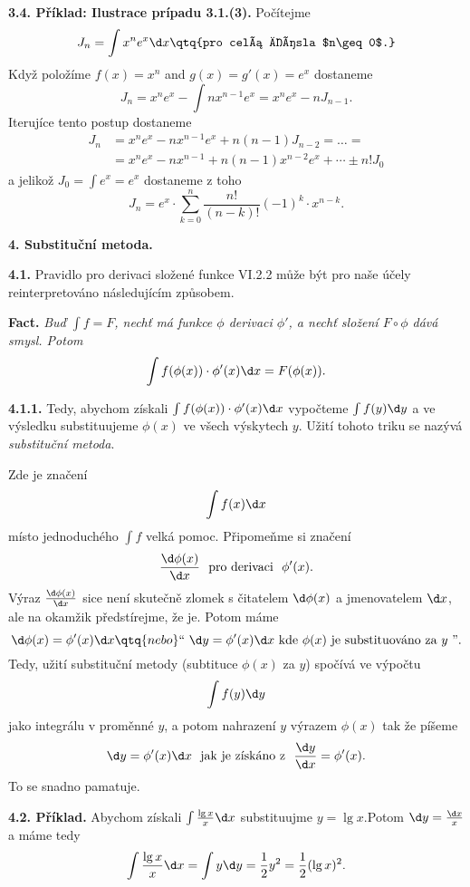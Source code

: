 \documentclass[12pt]{article}
\begin{document}
{ \bigskip
 
 {\bf 3.4. Příklad: Ilustrace prípadu 3.1.(3).} Počítejme
 $$
 J_n=\int x^ne^x\d x \qtq{pro celá čísla $n\geq 0$.}
 $$
Když položíme $f(x)=x^n$ and $g(x)=g'(x)=e^x$ dostaneme
 $$
 J_n=x^ne^x-\int nx^{n-1}e^x= x^ne^x-nJ_{n-1}.
 $$
 Iterujíce tento postup dostaneme
 $$
 \begin{aligned}
 J_n&=x^ne^x-nx^{n-1}e^x+n(n-1)J_{n-2}=\dots=\\
 &=x^ne^x-nx^{n-1}+n(n-1)x^{n-2}e^x+\cdots\pm n!J_0
 \end{aligned}
 $$
 a jelikož $J_0=\int e^x=e^x$ dostaneme z toho
 $$
 J_n=e^x\cdot\sum_{k=0}^n\frac{n!}{(n-k)!}(-1)^k\cdot x^{n-k}.
 $$
 
 \vskip10mm
 
 {\large\bf 4. Substituční metoda.}
 
  
 \bigskip
 
 {\bf 4.1.} Pravidlo pro derivaci složené funkce VI.2.2 může být pro naše účely reinterpretováno následujícím způsobem.
 
 \medskip
 
 {\bf Fact.} {\em Buď $\int f=F$, nechť má funkce $\phi$ derivaci $\phi'$, a nechť složení $F\circ\phi$ dává smysl. Potom
 $$
 \int f(\phi(x))\cdot\phi'(x)\d x=F(\phi(x)).
 $$}
 
 \medskip
 
 {\bf 4.1.1.} Tedy, abychom získali $\int f(\phi(x))\cdot\phi'(x)\d x$ vypočteme
 $\int f(y)\d y$ a ve výsledku substituujeme $\phi(x)$ ve všech výskytech $y$. Užití tohoto triku se nazývá {\em substituční metoda}.
 
 \smallskip
 
 Zde je značení
 $$
 \int f(x)\d x
 $$
 místo jednoduchého $\int f$ velká pomoc. Připomeňme si značení
 $$
 \frac{\d\phi(x)}{\d x}\ \ \text{pro derivaci}\ \ \phi'(x).
 $$
 Výraz  $\frac{\d\phi(x)}{\d x}$ sice není skutečně zlomek s čitatelem $\d\phi(x)$ a jmenovatelem $\d x$, ale na okamžik předstírejme, že je. Potom máme
 $$
 \d\phi(x)=\phi'(x)\d x \qtq{nebo} ``\ \d y=\phi'(x)\d x \ \text{kde}\ \phi(x)\ \text{je substituováno za $y$ ''}.
 $$
 Tedy, užití substituční metody (subtituce $\phi(x)$ za $y$) spočívá ve výpočtu
 $$
 \int f(y)\d y
 $$
 jako integrálu v proměnné $y$, a potom nahrazení $y$ výrazem $\phi(x)$ tak že píšeme
 $$
 \d y=\phi'(x)\d x\ \ \text{jak je získáno z}\ \ \frac{\d y}{\d x}=\phi'(x).
 $$
 To se snadno pamatuje.
 
 \bigskip
 
 {\bf 4.2. Příklad.} Abychom získali 
 $
 \int\frac{\lg x}{x}\d x
 $
 substituujme $y=\lg x$.Potom $\d y=\frac{\d x}{x}$ a máme tedy
 $$
 \int\frac{\lg x}{x}\d x=\int y\d y=\frac12 y^2=\frac12 (\lg x)^2.
 $$ 
 
}
\end{document}
